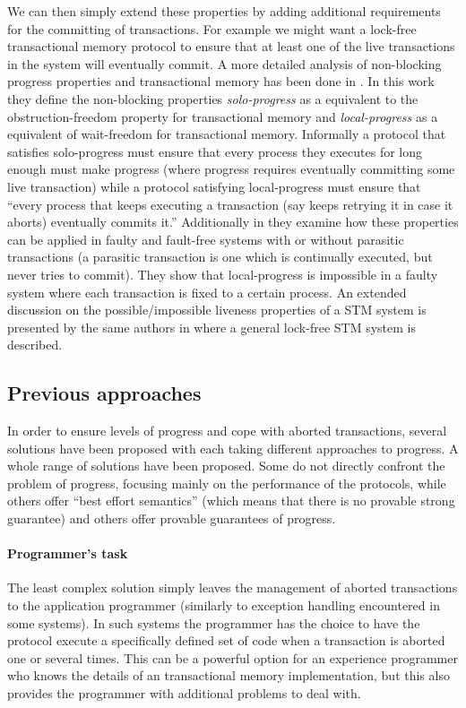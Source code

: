 We can then simply extend these properties by adding additional requirements
for the committing of transactions.
For example we might want a lock-free transactional memory protocol
to ensure that at least one of the live transactions in the system will
eventually commit.
A more detailed analysis of non-blocking progress properties and
transactional memory has been done in \cite{BGK12}.
In this work they define the non-blocking properties
\emph{solo-progress}
as a equivalent to the obstruction-freedom property
for transactional memory and
\emph{local-progress} as a equivalent
of wait-freedom for transactional memory.
Informally a protocol that satisfies solo-progress must ensure
that every process they executes for long enough
must make progress (where progress requires eventually committing
some live transaction) while a protocol satisfying
local-progress must ensure that
``every process that keeps
executing a transaction (say keeps retrying it in case it aborts)
eventually commits it.''
Additionally in \cite{BGK12} they examine how these properties can be applied
in faulty and fault-free systems with or without parasitic transactions
(a parasitic transaction is one which is continually executed, but never
tries to commit).
They show that local-progress is impossible in a faulty system
where each transaction is fixed to a certain process.
An extended discussion on the possible/impossible liveness properties 
of a STM system is presented by the same authors in \cite{GK10} where a general 
 lock-free STM system is described.

\subsection{Previous approaches}
In order to ensure levels of progress and cope with aborted transactions,
several solutions have been proposed with each taking different approaches
to progress.
A whole range of solutions have been proposed.
Some do not directly confront the problem of progress,
focusing mainly on the performance of the protocols, while
others  offer   ``best effort semantics'' 
(which  means that there is no provable  strong guarantee)
and others offer provable guarantees of progress.

\paragraph{Programmer's task}
The least complex solution simply leaves the  management of aborted transactions
to the application programmer (similarly to  exception handling
encountered  in  some systems).
In such systems the programmer has the choice to have the protocol execute 
a specifically defined set of code when a transaction is aborted one or several times.
This can be a powerful option for an experience programmer who knows the details
of an transactional memory implementation, but this also provides the programmer
with additional problems to deal with.


